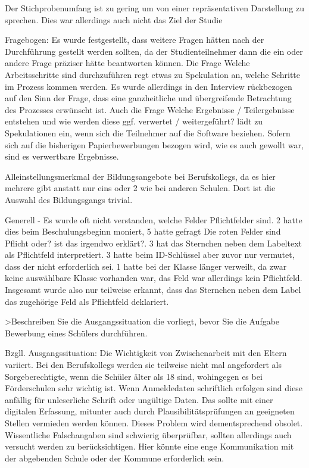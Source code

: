 Der Stichprobenumfang ist zu gering um von einer repräsentativen Darstellung zu sprechen. Dies war allerdings auch nicht das Ziel der Studie


Fragebogen: Es wurde festgestellt, dass weitere Fragen hätten nach der Durchführung gestellt werden sollten, da der Studienteilnehmer dann die ein oder andere Frage präziser hätte beantworten können.
Die Frage \glqq Welche Arbeitsschritte sind durchzuführen\grqq{} regt etwas zu Spekulation an, welche Schritte im Prozess kommen werden. Es wurde allerdings in den Interview rückbezogen auf den Sinn der Frage, dass eine ganzheitliche und übergreifende Betrachtung des Prozesses erwünscht ist.
Auch die Frage \glqq Welche Ergebnisse / Teilergebnisse entstehen und wie werden diese ggf. verwertet / weitergeführt?\grqq{} lädt zu Spekulationen ein, wenn sich die Teilnehmer auf die Software beziehen. Sofern sich auf die bisherigen Papierbewerbungen bezogen wird, wie es auch gewollt war, sind es verwertbare Ergebnisse.

Alleinstellungsmerkmal der Bildungsangebote bei Berufskollegs, da es hier mehrere gibt anstatt nur eins oder 2 wie bei anderen Schulen. Dort ist die Auswahl des Bildungsgangs trivial.

Generell
- Es wurde oft nicht verstanden, welche Felder Pflichtfelder sind. 2 hatte dies beim Beschulungsbeginn moniert, 5 hatte gefragt \glqq Die roten Felder sind Pflicht oder? ist das irgendwo erklärt?\grqq{}. 3 hat das Sternchen neben dem Labeltext als Pflichtfeld interpretiert. 3 hatte beim ID-Schlüssel aber zuvor nur vermutet, dass der nicht erforderlich sei. 1 hatte bei der Klasse länger verweilt, da zwar keine auswählbare Klasse vorhanden war, das Feld war allerdings kein Pflichtfeld. Insgesamt wurde also nur teilweise  erkannt, dass das Sternchen neben dem Label das zugehörige Feld als Pflichtfeld deklariert.



>Beschreiben Sie die Ausgangssituation die vorliegt, bevor Sie die Aufgabe \glqq Bewerbung eines Schülers\grqq{} durchführen.


Bzgll. Ausgangssituation:
Die Wichtigkeit von Zwischenarbeit mit den Eltern variiert. Bei den Berufskollegs werden sie teilweise nicht mal angefordert als Sorgeberechtigte, wenn die Schüler älter als 18 sind, wohingegen es bei Förderschulen sehr wichtig ist.
Wenn Anmeldedaten schriftlich erfolgen sind diese anfällig für unleserliche Schrift oder ungültige Daten. Das sollte mit einer digitalen Erfassung, mitunter auch durch Plausibilitätsprüfungen an geeigneten Stellen vermieden werden können. Dieses Problem wird dementsprechend obsolet. Wissentliche Falschangaben sind schwierig überprüfbar, sollten allerdings auch versucht werden zu berücksichtigen. Hier könnte eine enge Kommunikation mit der abgebenden Schule oder der Kommune erforderlich sein.



